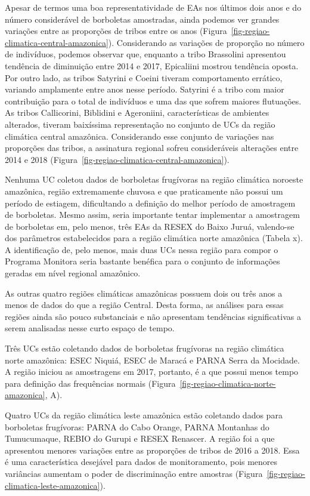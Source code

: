 \documentclass[
  letterpaper,
]{scrbook}
\begin{document}
Apesar de termos uma boa representatividade de EAs nos últimos dois anos
e do número considerável de borboletas amostradas, ainda podemos ver
grandes variações entre as proporções de tribos entre os anos
(Figura~\ref{fig-regiao-climatica-central-amazonica}). Considerando as
variações de proporção no número de indivíduos, podemos observar que,
enquanto a tribo Brassolini apresentou tendência de diminuição entre
2014 e 2017, Epicaliini mostrou tendência oposta. Por outro lado, as
tribos Satyrini e Coeini tiveram comportamento errático, variando
amplamente entre anos nesse período. Satyrini é a tribo com maior
contribuição para o total de indivíduos e uma das que sofrem maiores
flutuações. As tribos Callicorini, Biblidini e Ageroniini,
características de ambientes alterados, tiveram baixíssima representação
no conjunto de UCs da região climática central amazônica. Considerando
esse conjunto de variações nas proporções das tribos, a assinatura
regional sofreu consideráveis alterações entre 2014 e 2018
(Figura~\ref{fig-regiao-climatica-central-amazonica}).

Nenhuma UC coletou dados de borboletas frugívoras na região climática
noroeste amazônica, região extremamente chuvosa e que praticamente não
possui um período de estiagem, dificultando a definição do melhor
período de amostragem de borboletas. Mesmo assim, seria importante
tentar implementar a amostragem de borboletas em, pelo menos, três EAs
da RESEX do Baixo Juruá, valendo-se dos parâmetros estabelecidos para a
região climática norte amazônica (Tabela x). A identificação de, pelo
menos, mais duas UCs nessa região para compor o Programa Monitora seria
bastante benéfica para o conjunto de informações geradas em nível
regional amazônico.

As outras quatro regiões climáticas amazônicas possuem dois ou três anos
a menos de dados do que a região Central. Desta forma, as análises para
essas regiões ainda são pouco substanciais e não apresentam tendências
significativas a serem analisadas nesse curto espaço de tempo.

Três UCs estão coletando dados de borboletas frugívoras na região
climática norte amazônica: ESEC Niquiá, ESEC de Maracá e PARNA Serra da
Mocidade. A região iniciou as amostragens em 2017, portanto, é a que
possui menos tempo para definição das frequências normais
(Figura~\ref{fig-regiao-climatica-norte-amazonica}, A).

Quatro UCs da região climática leste amazônica estão coletando dados
para borboletas frugívoras: PARNA do Cabo Orange, PARNA Montanhas do
Tumucumaque, REBIO do Gurupi e RESEX Renascer. A região foi a que
apresentou menores variações entre as proporções de tribos de 2016 a
2018. Essa é uma característica desejável para dados de monitoramento,
pois menores variâncias aumentam o poder de discriminação entre amostras
(Figura~\ref{fig-regiao-climatica-leste-amazonica}).
\end{document}
